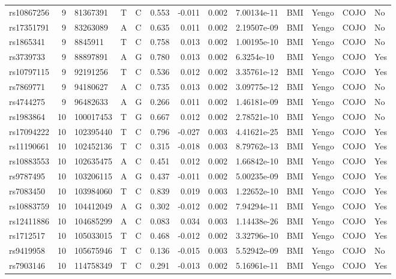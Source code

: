 \documentclass[11pt,twoside]{bristolthesis}
\begin{document}
\begin{longtable}[t]{lrlllrrrlllll}
rs10867256 & 9 & 81367391 & T & C & 0.553 & -0.011 & 0.002 & 7.00134e-11 & BMI & Yengo & COJO & No\\
\addlinespace
rs17351791 & 9 & 83263089 & A & C & 0.635 & 0.011 & 0.002 & 2.19507e-09 & BMI & Yengo & COJO & No\\
rs1865341 & 9 & 8845911 & T & C & 0.758 & 0.013 & 0.002 & 1.00195e-10 & BMI & Yengo & COJO & No\\
rs3739733 & 9 & 88897891 & A & G & 0.780 & 0.013 & 0.002 & 6.3254e-10 & BMI & Yengo & COJO & Yes\\
rs10797115 & 9 & 92191256 & T & C & 0.536 & 0.012 & 0.002 & 3.35761e-12 & BMI & Yengo & COJO & Yes\\
rs7869771 & 9 & 94180627 & A & C & 0.735 & 0.013 & 0.002 & 3.09775e-12 & BMI & Yengo & COJO & No\\
\addlinespace
rs4744275 & 9 & 96482633 & A & G & 0.266 & 0.011 & 0.002 & 1.46181e-09 & BMI & Yengo & COJO & No\\
rs1983864 & 10 & 100017453 & T & G & 0.667 & 0.012 & 0.002 & 2.78521e-10 & BMI & Yengo & COJO & No\\
rs17094222 & 10 & 102395440 & T & C & 0.796 & -0.027 & 0.003 & 4.41621e-25 & BMI & Yengo & COJO & Yes\\
rs11190661 & 10 & 102452136 & T & C & 0.315 & -0.018 & 0.003 & 8.79762e-13 & BMI & Yengo & COJO & Yes\\
rs10883553 & 10 & 102635475 & A & C & 0.451 & 0.012 & 0.002 & 1.66842e-10 & BMI & Yengo & COJO & Yes\\
\addlinespace
rs9787495 & 10 & 103206115 & A & G & 0.437 & -0.011 & 0.002 & 5.00235e-09 & BMI & Yengo & COJO & Yes\\
rs7083450 & 10 & 103984060 & T & C & 0.839 & 0.019 & 0.003 & 1.22652e-10 & BMI & Yengo & COJO & Yes\\
rs10883759 & 10 & 104412049 & A & G & 0.302 & -0.012 & 0.002 & 7.94294e-11 & BMI & Yengo & COJO & Yes\\
rs12411886 & 10 & 104685299 & A & C & 0.083 & 0.034 & 0.003 & 1.14438e-26 & BMI & Yengo & COJO & Yes\\
rs1712517 & 10 & 105033015 & T & C & 0.468 & -0.012 & 0.002 & 3.32796e-10 & BMI & Yengo & COJO & Yes\\
\addlinespace
rs9419958 & 10 & 105675946 & T & C & 0.136 & -0.015 & 0.003 & 5.52942e-09 & BMI & Yengo & COJO & No\\
rs7903146 & 10 & 114758349 & T & C & 0.291 & -0.013 & 0.002 & 5.16961e-11 & BMI & Yengo & COJO & Yes\\

\end{longtable}
\end{document}
